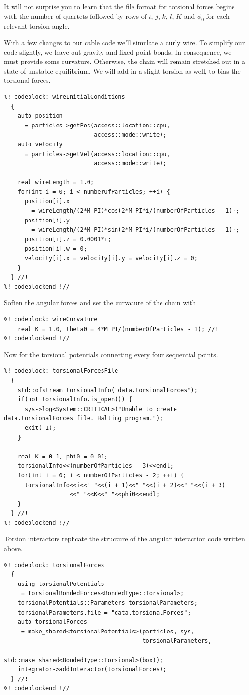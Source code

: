 It will not surprise you to learn that the file format for torsional forces
begins with the number of quartets followed by rows of $i$, $j$, $k$, $l$, $K$
and $\phi_0$ for each relevant torsion angle.

With a few changes to our cable code we'll simulate a curly wire. To simplify
our code slightly, we leave out gravity and fixed-point bonds. In consequence,
we must provide some curvature. Otherwise, the chain will remain stretched out
in a state of unstable equilibrium. We will add in a slight torsion as well, to
bias the torsional forces.
\begin{lstlisting}
%! codeblock: wireInitialConditions
  {
    auto position
      = particles->getPos(access::location::cpu,
                          access::mode::write);
    auto velocity
      = particles->getVel(access::location::cpu,
                          access::mode::write);

    real wireLength = 1.0;
    for(int i = 0; i < numberOfParticles; ++i) {
      position[i].x
        = wireLength/(2*M_PI)*cos(2*M_PI*i/(numberOfParticles - 1));
      position[i].y
        = wireLength/(2*M_PI)*sin(2*M_PI*i/(numberOfParticles - 1));
      position[i].z = 0.0001*i;
      position[i].w = 0;
      velocity[i].x = velocity[i].y = velocity[i].z = 0;
    }
  } //!
%! codeblockend !//
\end{lstlisting}
Soften the angular forces and set the curvature of the chain with
\begin{lstlisting}
%! codeblock: wireCurvature
    real K = 1.0, theta0 = 4*M_PI/(numberOfParticles - 1); //!
%! codeblockend !//
\end{lstlisting}
Now for the torsional potentials connecting every four sequential points.
\begin{lstlisting}
%! codeblock: torsionalForcesFile
  {
    std::ofstream torsionalInfo("data.torsionalForces");
    if(not torsionalInfo.is_open()) {
      sys->log<System::CRITICAL>("Unable to create data.torsionalForces file. Halting program.");
      exit(-1);
    }

    real K = 0.1, phi0 = 0.01;
    torsionalInfo<<(numberOfParticles - 3)<<endl;
    for(int i = 0; i < numberOfParticles - 2; ++i) {
      torsionalInfo<<i<<" "<<(i + 1)<<" "<<(i + 2)<<" "<<(i + 3)
                   <<" "<<K<<" "<<phi0<<endl;
    }
  } //!
%! codeblockend !//
\end{lstlisting}
Torsion interactors replicate the structure of the angular interaction code
written above.
\begin{lstlisting}
%! codeblock: torsionalForces
  {
    using torsionalPotentials
     = TorsionalBondedForces<BondedType::Torsional>;
    torsionalPotentials::Parameters torsionalParameters;
    torsionalParameters.file = "data.torsionalForces";
    auto torsionalForces
     = make_shared<torsionalPotentials>(particles, sys,
                                        torsionalParameters,
                                        std::make_shared<BondedType::Torsional>(box));
    integrator->addInteractor(torsionalForces);
  } //!
%! codeblockend !//
\end{lstlisting}
